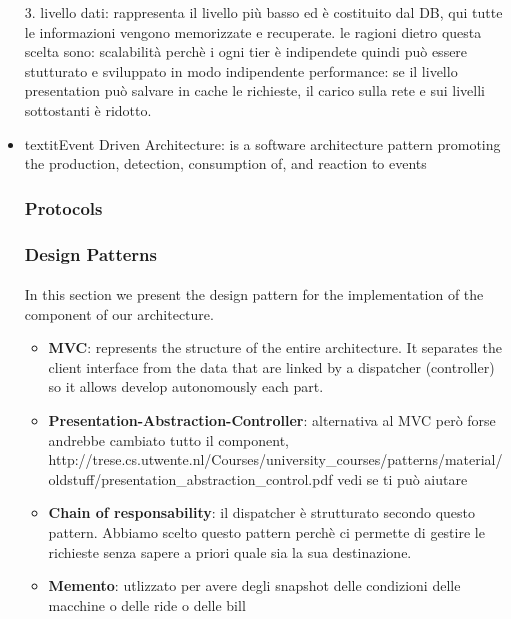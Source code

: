 \documentclass[english]{article}
\begin{document}
\begin{itemize}
{                                        3. livello dati: rappresenta il livello più basso ed è costituito dal DB, qui tutte le informazioni vengono memorizzate e recuperate.
                                        le ragioni dietro questa scelta sono: scalabilità perchè i ogni tier è indipendete quindi può essere stutturato e sviluppato in modo indipendente
                                                                              performance: se il livello presentation può salvare in cache le richieste, il carico sulla rete e sui livelli sottostanti è ridotto.}
\item{textit{Event Driven Architecture}: is a software architecture pattern promoting the production, detection, consumption of, and reaction to events}
\subsubsection{Protocols}

\subsubsection{Design Patterns}

\paragraph{}
In this section we present the design pattern for the implementation of the component of our architecture.

\begin{itemize}
  \item{\textbf{MVC}: represents the structure of the entire architecture. It separates the client interface from the data that are linked by a dispatcher (controller) so it allows develop autonomously each part.}
  \item{\textbf{Presentation-Abstraction-Controller}: alternativa al MVC però forse andrebbe cambiato tutto il component, http://trese.cs.utwente.nl/Courses/university_courses/patterns/material/oldstuff/presentation_abstraction_control.pdf vedi se ti può aiutare}
  \item{\textbf{Chain of responsability}: il dispatcher è strutturato secondo questo pattern. Abbiamo scelto questo pattern perchè ci permette di gestire le richieste senza sapere a priori quale sia la sua destinazione.}
  \item{\textbf{Memento}: utlizzato per avere degli snapshot delle condizioni delle macchine o delle ride o delle bill }
\end{itemize}


\end{itemize}
\end{document}
